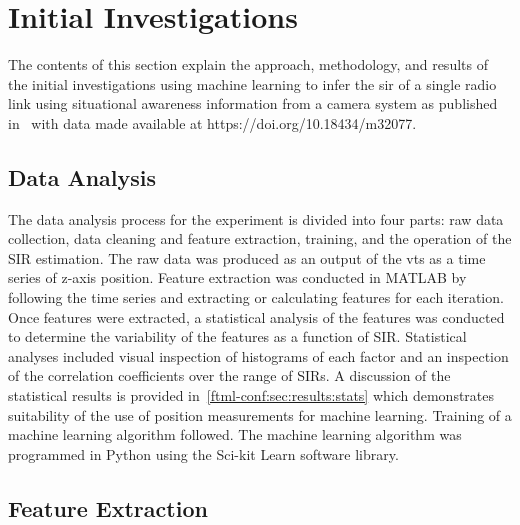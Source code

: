 \section{Initial Investigations}

The contents of this section explain the approach, methodology, and results of the initial investigations using machine learning to infer the \gls{sir} of a single radio link using situational awareness information from a camera system as published in~\cite{CandellISIE2019.Conf} with data made available at https://doi.org/10.18434/m32077.

\subsection{Data Analysis}\label{ftml-conf:sec:dataanalysis}


The data analysis process for the experiment
is divided into four parts: raw data collection, data cleaning and feature extraction, training, and the operation of the SIR estimation.  The raw data was produced as an output of the \gls{vts} as a time series of z-axis position.  Feature extraction was conducted in MATLAB by following the time series and extracting or calculating features for each iteration.  Once features were extracted, a statistical analysis of the features was conducted to determine the variability of the features as a function of SIR.  Statistical analyses included visual inspection of histograms of each factor and an inspection of the correlation coefficients over the range  of SIRs.  A discussion of the statistical results is provided in~\ref{ftml-conf:sec:results:stats} which demonstrates suitability of the use of position measurements for machine learning. Training of a machine learning algorithm followed. The machine learning algorithm was programmed in Python using the Sci-kit Learn software library.

\subsection{Feature Extraction}\label{ftml-conf:sec:data:feats}

